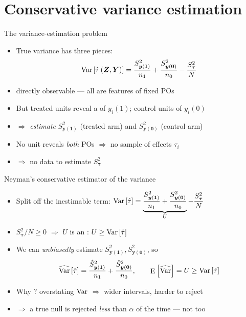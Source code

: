\documentclass[table, xcolor = {dvipsnames}, 9pt]{beamer}
\theoremstyle{plain}
\newcommand{\mh}[1]{{\color{magenta}{#1}}}
\DeclareMathOperator{\E}{\rm{E}}
\DeclareMathOperator{\Var}{\rm{Var}}
\begin{document}
\section{Conservative variance estimation}

\begin{frame}[t]{The variance-estimation problem}
\vfill
\begin{itemize} \vfill
\item True variance has three pieces:
\begin{equation*}
\Var\left[\hat{\tau}\left(\bm{Z}, \bm{Y}\right)\right] = \frac{S^2_{\bm{y}(\bm{1})}}{n_1} + \frac{S^2_{\bm{y}(\bm{0})}}{n_0} - \frac{S^2_{\bm{\tau}}}{N}
\end{equation*} \vfill
\item \mh{None} directly observable --- all are features of fixed POs \vfill
\item But treated units reveal a \mh{sample} of $y_i(1)$; control units of $y_i(0)$ \vfill
\item[] $\Rightarrow$ \emph{estimate} $S^2_{\bm{y}(\bm{1})}$ (treated arm) and $S^2_{\bm{y}(\bm{0})}$ (control arm) \vfill
\item No unit reveals \emph{both} POs $\Rightarrow$ no sample of effects $\tau_i$ \vfill
\item[] $\Rightarrow$ no data to estimate $S^2_{\bm{\tau}}$ \vfill
\end{itemize} \vfill
\end{frame}
\begin{frame}[t]{Neyman's conservative estimator of the variance}
\vfill
\begin{itemize} \vfill
\item Split off the inestimable term: $\Var\left[\hat{\tau}\right] = \underbrace{\dfrac{S^2_{\bm{y}(\bm{1})}}{n_1} + \dfrac{S^2_{\bm{y}(\bm{0})}}{n_0}}_{U} - \dfrac{S^2_{\bm{\tau}}}{N}$ \vfill
\item $S^2_{\bm{\tau}}/N \geq 0$ $\Rightarrow$ $U$ is an \mh{upper bound}: $U \geq \Var\left[\hat{\tau}\right]$ \vfill
\item We can \emph{unbiasedly} estimate $S^2_{\bm{y}(\bm{1})}, S^2_{\bm{y}(\bm{0})}$, so
\begin{equation*}
\widehat{\Var}\left[\hat{\tau}\right] = \frac{\hat{S}^2_{\bm{y}(\bm{1})}}{n_1} + \frac{\hat{S}^2_{\bm{y}(\bm{0})}}{n_0}, \qquad \E\left[\widehat{\Var}\right] = U \geq \Var\left[\hat{\tau}\right]
\end{equation*} \vfill
\item Why \mh{conservative}? overstating $\Var$ $\Rightarrow$ wider intervals, harder to reject \vfill
\item[] $\Rightarrow$ a true null is rejected \emph{less} than $\alpha$ of the time --- not too \mh{liberal} \vfill
\end{itemize} \vfill
\end{frame}
\end{document}
